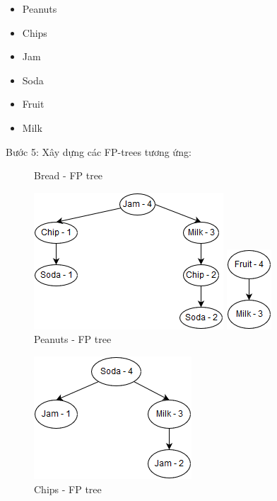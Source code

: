 \documentclass{article}
\begin{document}
\begin{flushleft}
\begin{itemize}
	\item Peanuts
	\item Chips
	\item Jam
	\item Soda
	\item Fruit
	\item Milk
\end{itemize}
Bước 5: Xây dựng các FP-trees tương ứng:
\begin{figure}[H]
	\centering
	\begin{minipage}[t]{0.5\textwidth}
		\centering
		\caption{Bread - FP tree}
		\includegraphics[scale = 0.5]{BreadTree}
	\end{minipage}%
	\begin{minipage}[t]{0.5\textwidth}
		\centering
		\caption{Peanuts - FP tree}
		\includegraphics[scale = 0.5]{PeanutsTree}
	\end{minipage}
\end{figure}
\begin{figure}[H]
	\centering
	\begin{minipage}[t]{0.5\textwidth}
		\centering
		\caption{Chips - FP tree}
		\includegraphics[scale = 0.5]{ChipsTree}
	\end{minipage}%
	\begin{minipage}[t]{0.5\textwidth}

\end{minipage}
\end{figure}
\end{flushleft}
\end{document}
